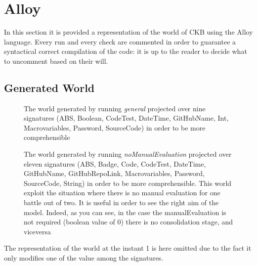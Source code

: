 \section{Alloy}
\lstset{
  language=alloy,
  basicstyle=\small\ttfamily,
  breaklines=true,
  showstringspaces=false
}


In this section it is provided a representation of the world of CKB using the Alloy language. Every run and every check are commented in order to guarantee a syntactical correct compilation of the code: it is up to the reader to decide what to uncomment based on their will.

\subsection{Generated World}
\begin{figure}[h]
  \centering
  \caption{The world generated by running \textit{general} projected over nine signatures (ABS, Boolean, CodeTest, DateTime, GitHubName, Int, Macrovariables, Password, SourceCode) in order to be more comprehensible}
\end{figure}

\begin{figure}[h]
  \centering
  \caption{The world generated by running \textit{noManualEvaluation} projected over eleven signatures (ABS, Badge, Code, CodeTest, DateTime, GitHubName, GitHubRepoLink, Macrovariables, Password, SourceCode, String) in order to be more comprehensible. This world exploit the situation where there is no manual evaluation for one battle out of two. It is useful in order to see the right aim of the model. Indeed, as you can see, in the case the manualEvaluation is not required (boolean value of 0) there is no consolidation stage, and viceversa}
\end{figure}

The representation of the world at the instant 1 is here omitted due to the fact it only modifies one of the value among the signatures.
